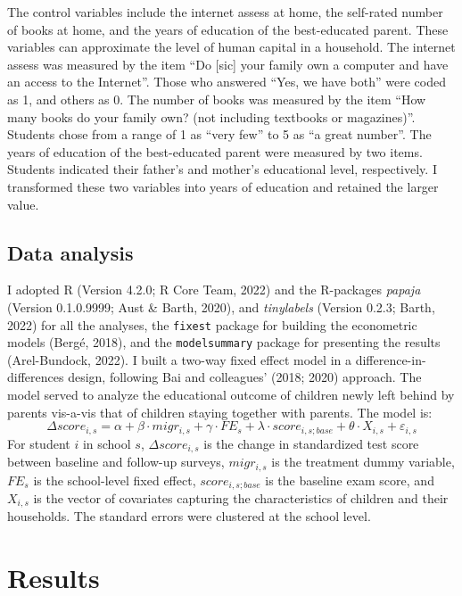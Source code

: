 \documentclass[
  man]{apa7}
\begin{document}
The control variables include the internet assess at home, the self-rated number of books at home, and the years of education of the best-educated parent. These variables can approximate the level of human capital in a household. The internet assess was measured by the item ``Do {[}sic{]} your family own a computer and have an access to the Internet''. Those who answered ``Yes, we have both'' were coded as 1, and others as 0. The number of books was measured by the item ``How many books do your family own? (not including textbooks or magazines)''. Students chose from a range of 1 as ``very few'' to 5 as ``a great number''. The years of education of the best-educated parent were measured by two items. Students indicated their father's and mother's educational level, respectively. I transformed these two variables into years of education and retained the larger value.

\hypertarget{data-analysis}{%
\subsection{Data analysis}\label{data-analysis}}

I adopted R (Version 4.2.0; R Core Team, 2022) and the R-packages \emph{papaja} (Version 0.1.0.9999; Aust \& Barth, 2020), and \emph{tinylabels} (Version 0.2.3; Barth, 2022) for all the analyses, the \texttt{fixest} package for building the econometric models (Bergé, 2018), and the \texttt{modelsummary} package for presenting the results (Arel-Bundock, 2022). I built a two-way fixed effect model in a difference-in-differences design, following Bai and colleagues' (2018; 2020) approach. The model served to analyze the educational outcome of children newly left behind by parents vis-a-vis that of children staying together with parents. The model is: \[\Delta score_{i,s} = \alpha + \beta \cdot migr_{i,s} + \gamma \cdot FE_{s} + \lambda \cdot score_{i,s;base} + \theta \cdot X_{i,s} + \varepsilon_{i,s}\]For student \(i\) in school \(s\), \(\Delta score_{i,s}\) is the change in standardized test score between baseline and follow-up surveys, \(migr_{i,s}\) is the treatment dummy variable, \(FE_{s}\) is the school-level fixed effect, \(score_{i,s;base}\) is the baseline exam score, and \(X_{i,s}\) is the vector of covariates capturing the characteristics of children and their households. The standard errors were clustered at the school level.

\hypertarget{results}{%
\section{Results}\label{results}}
\end{document}
